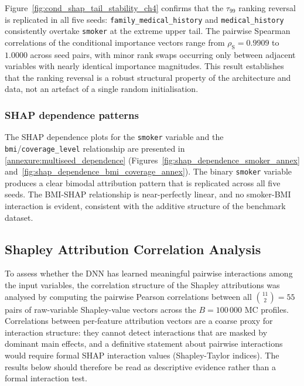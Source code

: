 \noindent
Figure~\ref{fig:cond_shap_tail_stability_ch4} confirms that the
$\tau_{99}$ ranking reversal is replicated in all five seeds:
\texttt{family\_medical\_\allowbreak{}history} and \texttt{medical\_\allowbreak{}history}
consistently overtake \texttt{smoker} at the extreme upper tail.  The
pairwise Spearman correlations of the conditional importance vectors
range from $\rho_{\mathrm{S}} = 0.9909$ to $1.0000$ across seed pairs,
with minor rank swaps occurring only between adjacent variables with
nearly identical importance magnitudes.  This result establishes that the
ranking reversal is a robust structural property of the architecture and
data, not an artefact of a single random initialisation.

\subsubsection{SHAP dependence patterns}

The SHAP dependence plots for the \texttt{smoker} variable and the
\texttt{bmi}/\texttt{coverage\_\allowbreak{}level} relationship are presented in
\ref{annexure:multiseed_dependence}
(Figures~\ref{fig:shap_dependence_smoker_annex}
and~\ref{fig:shap_dependence_bmi_coverage_annex}).  The binary
\texttt{smoker} variable produces a clear bimodal attribution pattern
that is replicated across all five seeds.  The
BMI-SHAP relationship is near-perfectly linear, and no smoker-BMI
interaction is evident, consistent with the additive structure of the
benchmark dataset.


\subsection{Shapley Attribution Correlation Analysis}
\label{sec:shap_interactions}

To assess whether the DNN has learned meaningful pairwise interactions
among the input variables, the correlation structure of the Shapley
attributions was analysed by computing the pairwise Pearson correlations
between all $\binom{11}{2} = 55$ pairs of raw-variable Shapley-value
vectors across the $B = 100\,000$ MC profiles.  Correlations
between per-feature attribution vectors are a coarse proxy for
interaction structure: they cannot detect interactions that are masked
by dominant main effects, and a definitive statement about pairwise
interactions would require formal SHAP interaction values
(Shapley-Taylor indices).  The results below should therefore be read
as descriptive evidence rather than a formal interaction test.

